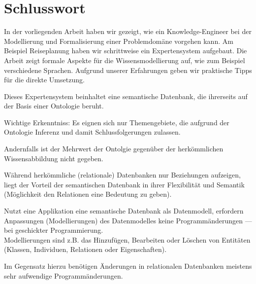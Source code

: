 \chapter{Schlusswort}
\label{chap:schlusswort}

In der vorliegenden Arbeit haben wir gezeigt, wie ein Knowledge-Engineer bei der Modellierung und Formalisierung einer Problemdomäne vorgehen kann. Am Beispiel Reiseplanung haben wir schrittweise ein Expertensystem aufgebaut. Die Arbeit zeigt formale Aspekte für die Wissensmodellierung auf, wie zum Beispiel verschiedene Sprachen. Aufgrund unserer Erfahrungen geben wir praktische Tipps für die direkte Umsetzung. 


Dieses Expertensystem beinhaltet eine semantische Datenbank, die ihrerseits auf der Basis einer Ontologie beruht.

Wichtige Erkenntniss: Es eignen sich nur Themengebiete, die aufgrund der Ontologie Inferenz und damit Schlussfolgerungen zulassen.

Andernfalls ist der Mehrwert der Ontolgie gegenüber der herkömmlichen Wissensabbildung nicht gegeben.

Während herkömmliche (relationale) Datenbanken nur Beziehungen aufzeigen, liegt der Vorteil der semantischen Datenbank in ihrer Flexibilität und Semantik (Möglichkeit den Relationen eine Bedeutung zu geben).

Nutzt eine Applikation eine semantische Datenbank als Datenmodell, erfordern Anpassungen (Modellierungen) des Datenmodelles keine Programmänderungen --- bei geschickter Programmierung.\\
Modellierungen sind z.B. das Hinzufügen, Bearbeiten oder Löschen von Entitäten (Klassen, Individuen, Relationen oder Eigenschaften).

Im Gegensatz hierzu benötigen Änderungen in relationalen Datenbanken meistens sehr aufwendige Programmänderungen.
